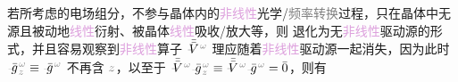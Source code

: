 若所考虑的电场组分，不参与晶体内的\textcolor{Plum}{非线性}光学/\textcolor{gray}{频率转换}过程，只在晶体中\textcolor{NavyBlue}{无源}且\textcolor{NavyBlue}{被动}地\textcolor{Plum}{线性}衍射、被晶体\textcolor{Plum}{线性}\textcolor{NavyBlue}{吸收}/\textcolor{NavyBlue}{放大}等，则  退化为无\textcolor{Plum}{非线性}\textcolor{NavyBlue}{驱动源}的形式，并且容易观察到\textcolor{Plum}{非线性}算子 $\Xint{\mathcolor{gray}{-}}{21}{\bar{\bar{V}}}^{\;\! \mathcolor{gray}{\omega}}$ 理应随着\textcolor{Plum}{非线性}\textcolor{NavyBlue}{驱动源}一起消失，因为此时 $\Xint{{}^{}_{\mathcolor{gray}{-}}}{10}{\bar{g}}^{\;\!\mathcolor{gray}{\omega}}_{\;\! \mathcolor{gray}{z}} \equiv \Xint{{}^{}_{\mathcolor{gray}{-}}}{10}{\bar{g}}^{\;\!\mathcolor{gray}{\omega}}$ 不再含 $\mathcolor{gray}{z}$，以至于 $\Xint{\mathcolor{gray}{-}}{21}{\bar{\bar{V}}}^{\;\! \mathcolor{gray}{\omega}} \Xint{{}^{}_{\mathcolor{gray}{-}}}{10}{\bar{g}}^{\;\!\mathcolor{gray}{\omega}}_{\;\! \mathcolor{gray}{z}} \equiv \Xint{\mathcolor{gray}{-}}{21}{\bar{\bar{V}}}^{\;\! \mathcolor{gray}{\omega}} \Xint{{}^{}_{\mathcolor{gray}{-}}}{10}{\bar{g}}^{\;\!\mathcolor{gray}{\omega}} = \bar{0}$，则有
